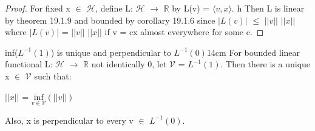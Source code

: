     \begin{proof}
        For fixed x $\in$ $\mathcal{H}$, define
        L: $\mathcal{H}$ $\rightarrow$ $\mathbb{R}$
        by L(v) = $\langle v , x \rangle$.
        h
        Then L is linear by {\color{red} theorem 19.1.9}
        and bounded by {\color{orange} corollary 19.1.6}
        since $|L(v)|$ $\leq$ $||v||$ $||x||$
        where $|L(v)|$ = $||v||$ $||x||$ if v = cx almost everywhere for some c.
    \end{proof}

    \newpage



    \begin{wtheorem}{inf($L^{-1}(1)$) is unique
    and perpendicular to $L^{-1}(0)$}{14cm}
        For bounded linear functional L: $\mathcal{H}$ $\rightarrow$ $\mathbb{R}$
        not identically 0, let $\mathcal{V}$ = $L^{-1}(1)$.
        Then there is a unique x $\in$ $\mathcal{V}$ such that:

        \hspace{0.5cm}
        $||x||$ = $\underset{v \in \mathcal{V}}{\text{inf}} (||v||)$

        Also, x is perpendicular to every v $\in$ $L^{-1}(0)$.
    \end{wtheorem}

